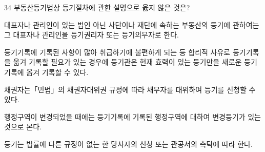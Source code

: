 \begin{question}{34}
부동산등기법상 등기절차에 관한 설명으로 옳지 않은 것은?
\begin{choices}
  \item 대표자나 관리인이 있는 법인 아닌 사단이나 재단에 속하는 부동산의 등기에 관하여는 그 대표자나 관리인을 등기권리자 또는 등기의무자로 한다.
  \item 등기기록에 기록된 사항이 많아 취급하기에 불편하게 되는 등 합리적 사유로 등기기록을 옮겨 기록할 필요가 있는 경우에 등기관은 현재 효력이 있는 등기만을 새로운 등기기록에 옮겨 기록할 수 있다.
  \item 채권자는「민법」의 채권자대위권 규정에 따라 채무자를 대위하여 등기를 신청할 수 있다.
  \item 행정구역이 변경되었을 때에는 등기기록에 기록된 행정구역에 대하여 변경등기가 있는 것으로 본다.
  \item 등기는 법률에 다른 규정이 없는 한 당사자의 신청 또는 관공서의 촉탁에 따라 한다.
\end{choices}
\end{question}
